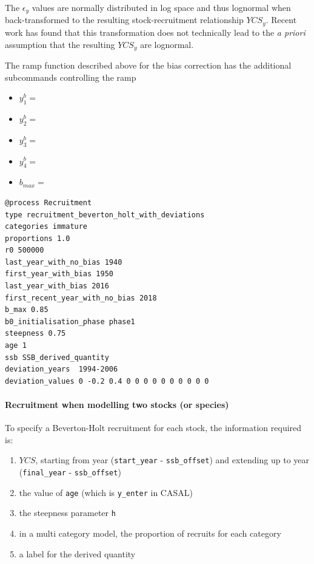 The $\epsilon_y$ values are normally distributed in log space and thus lognormal when back-transformed to the resulting stock-recruitment relationship $YCS_y$. Recent work has found that this transformation does not technically lead to the \textit{a priori} assumption that the resulting $YCS_y$ are lognormal. 

The ramp function described above for the bias correction has the additional subcommands controlling the ramp

\begin{itemize}
	\item $y_1^b = $ 
	\item $y_2^b = $ 
	\item $y_3^b = $ 
	\item $y_4^b = $ 
	\item $b_{max} = $ 
\end{itemize}

{\small{\begin{verbatim}
@process Recruitment
type recruitment_beverton_holt_with_deviations
categories immature
proportions 1.0
r0 500000
last_year_with_no_bias 1940
first_year_with_bias 1950
last_year_with_bias 2016
first_recent_year_with_no_bias 2018
b_max 0.85
b0_initialisation_phase phase1
steepness 0.75
age 1
ssb SSB_derived_quantity
deviation_years  1994-2006
deviation_values 0 -0.2 0.4 0 0 0 0 0 0 0 0 0 0
\end{verbatim}}}

\paragraph*{Recruitment when modelling two stocks (or species)}

To specify a Beverton-Holt recruitment for each stock, the information required is:

\begin{enumerate}
	\item $YCS$, starting from year (\texttt{start\_year} - \texttt{ssb\_offset}) and extending up to year (\texttt{final\_year} - \texttt{ssb\_offset})
	\item the value of \texttt{age} (which is \texttt{y\_enter} in CASAL)
	\item the steepness parameter \texttt{h}
	\item in a multi category model, the proportion of recruits for each category
	\item a label for the derived quantity
\end{enumerate}

